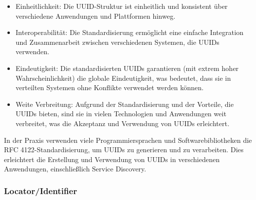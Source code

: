 \documentclass[../vs-script-first-v01.tex]{subfiles}
\begin{document}
\begin{itemize}
\item Einheitlichkeit: Die UUID-Struktur ist einheitlich und konsistent über verschiedene Anwendungen und Plattformen hinweg.
\item Interoperabilität: Die Standardisierung ermöglicht eine einfache Integration und Zusammenarbeit zwischen verschiedenen Systemen, die UUIDs verwenden.
\item Eindeutigkeit: Die standardisierten UUIDs garantieren (mit extrem hoher Wahrscheinlichkeit) die globale Eindeutigkeit, was bedeutet, dass sie in verteilten Systemen ohne Konflikte verwendet werden können.
\item Weite Verbreitung: Aufgrund der Standardisierung und der Vorteile, die UUIDs bieten, sind sie in vielen Technologien und Anwendungen weit verbreitet, was die Akzeptanz und Verwendung von UUIDs erleichtert.
\end{itemize}
In der Praxis verwenden viele Programmiersprachen und Softwarebibliotheken die RFC 4122-Standardisierung, um UUIDs zu generieren und zu verarbeiten. Dies erleichtert die Erstellung und Verwendung von UUIDs in verschiedenen Anwendungen, einschließlich Service Discovery.


\subsubsection{Locator/Identifier}
\end{document}
